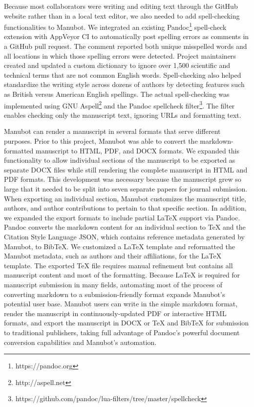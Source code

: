 \documentclass[twocolumn]{ceurart}
\begin{document}
Because most collaborators were writing and editing text through the GitHub website rather than in a local text editor, we also needed to add spell-checking functionalities to Manubot.
We integrated an existing Pandoc\footnote{https://pandoc.org} spell-check extension with AppVeyor CI to automatically post spelling errors as comments in a GitHub pull request.
The comment reported both unique misspelled words and all locations in which those spelling errors were detected.
Project maintainers created and updated a custom dictionary to ignore over 1,500 scientific and technical terms that are not common English words.
Spell-checking also helped standardize the writing style across dozens of authors by detecting features such as British versus American English spellings.
The actual spell-checking was implemented using GNU Aspell\footnote{http://aspell.net} and the Pandoc spellcheck filter\footnote{https://github.com/pandoc/lua-filters/tree/master/spellcheck}.
The filter enables checking only the manuscript text, ignoring URLs and formatting text.

Manubot can render a manuscript in several formats that serve different purposes.
Prior to this project, Manubot was able to convert the markdown-formatted manuscript to HTML, PDF, and DOCX formats.
We expanded this functionality to allow individual sections of the manuscript to be exported as separate DOCX files while still rendering the complete manuscript in HTML and PDF formats.
This development was necessary because the manuscript grew so large that it needed to be split into seven separate papers for journal submission.
When exporting an individual section, Manubot customizes the manuscript title, authors, and author contributions to pertain to that specific section.
In addition, we expanded the export formats to include partial LaTeX support via Pandoc.
Pandoc converts the markdown content for an individual section to TeX and the Citation Style Language JSON, which contains reference metadata generated by Manubot, to BibTeX.
We customized a LaTeX template and reformatted the Manubot metadata, such as authors and their affiliations, for the LaTeX template.
The exported TeX file requires manual refinement but contains all manuscript content and most of the formatting.
Because LaTeX is required for manuscript submission in many fields, automating most of the process of converting markdown to a submission-friendly format expands Manubot's potential user base.
Manubot users can write in the simple markdown format, render the manuscript in continuously-updated PDF or interactive HTML formats, and export the manuscript in DOCX or TeX and BibTeX for submission to traditional publishers, taking full advantage of Pandoc's powerful document conversion capabilities and Manubot's automation.
\end{document}
